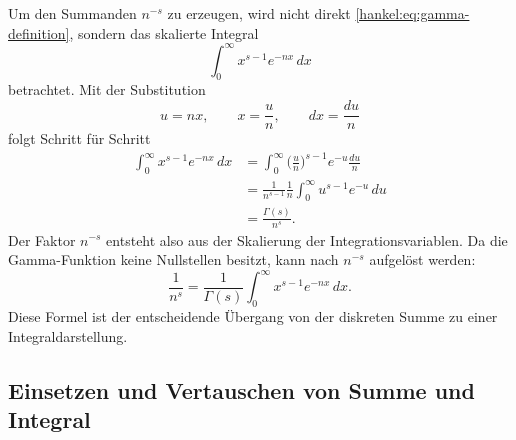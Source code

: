 Um den Summanden $n^{-s}$ zu erzeugen, wird nicht direkt
\eqref{hankel:eq:gamma-definition}, sondern das skalierte Integral
\begin{equation}
\int_0^\infty x^{s-1}e^{-nx}\,dx
\label{hankel:eq:skaliertes-gamma-integral}
\end{equation}
betrachtet. 
Mit der Substitution
\begin{equation}
u=nx,
\qquad
x=\frac{u}{n},
\qquad
dx=\frac{du}{n}
\label{hankel:eq:substitution-mellin}
\end{equation}
folgt Schritt für Schritt
\begin{equation}
\begin{aligned}
\int_0^\infty x^{s-1}e^{-nx}\,dx
&=
\int_0^\infty
\biggl(\frac{u}{n}\biggr)^{s-1}
e^{-u}\frac{du}{n}
\\
&=
\frac{1}{n^{s-1}}\frac{1}{n}
\int_0^\infty u^{s-1}e^{-u}\,du
\\
&=
\frac{\Gamma(s)}{n^s}.
\end{aligned}
\label{hankel:eq:gamma-skaliert}
\end{equation}
Der Faktor $n^{-s}$ entsteht also aus der Skalierung der
Integrationsvariablen. 
Da die Gamma-Funktion keine Nullstellen besitzt, kann nach $n^{-s}$ aufgelöst werden:
\begin{equation}
\frac{1}{n^s}
=
\frac{1}{\Gamma(s)}
\int_0^\infty
x^{s-1}e^{-nx}
\,dx.
\label{hankel:eq:n-minus-s-integral}
\end{equation}
Diese Formel ist der entscheidende Übergang von der diskreten Summe zu einer Integraldarstellung.

\subsection{Einsetzen und Vertauschen von Summe und Integral}

